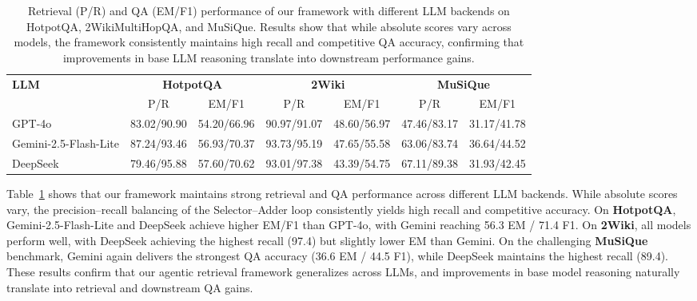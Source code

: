 \documentclass{article} %
\begin{document}
\begin{table}[ht]
\centering
\small
\setlength{\tabcolsep}{4pt} %
\caption{Retrieval (P/R) and QA (EM/F1) performance of our framework with different LLM backends on HotpotQA, 2WikiMultiHopQA, and MuSiQue. Results show that while absolute scores vary across models, the framework consistently maintains high recall and competitive QA accuracy, confirming that improvements in base LLM reasoning translate into downstream performance gains.}

\begin{tabular}{l|c|c|c|c|c|c}
\toprule
\multirow{2}{*}{\textbf{LLM}}
& \multicolumn{2}{c|}{\textbf{HotpotQA}} 
& \multicolumn{2}{c|}{\textbf{2Wiki}} 
& \multicolumn{2}{c}{\textbf{MuSiQue}} \\
\cmidrule(lr){2-3} \cmidrule(lr){4-5} \cmidrule(lr){6-7}
 & P/R & EM/F1 & P/R & EM/F1 & P/R & EM/F1 \\
\midrule
GPT-4o & 83.02/90.90 & 54.20/66.96 & 90.97/91.07  & 48.60/56.97 & 47.46/83.17 & 31.17/41.78 \\
\midrule
Gemini-2.5-Flash-Lite & 87.24/93.46 & 56.93/70.37 & 93.73/95.19  & 47.65/55.58  & 63.06/83.74  & 36.64/44.52 \\
\midrule
DeepSeek              & 79.46/95.88    & 57.60/70.62    & 93.01/97.38  & 43.39/54.75  & 67.11/89.38  & 31.93/42.45  \\
\bottomrule
\end{tabular}
\label{tab:llm_results}
\end{table}
Table~\ref{tab:llm_results} shows that our framework maintains strong retrieval and QA performance across different LLM backends. 
While absolute scores vary, the precision--recall balancing of the Selector--Adder loop consistently yields high recall and competitive accuracy. 
On \textbf{HotpotQA}, Gemini-2.5-Flash-Lite and DeepSeek achieve higher EM/F1 than GPT-4o, with Gemini reaching 56.3 EM / 71.4 F1. 
On \textbf{2Wiki}, all models perform well, with DeepSeek achieving the highest recall (97.4) but slightly lower EM than Gemini. 
On the challenging \textbf{MuSiQue} benchmark, Gemini again delivers the strongest QA accuracy (36.6 EM / 44.5 F1), while DeepSeek maintains the highest recall (89.4). 
These results confirm that our agentic retrieval framework generalizes across LLMs, and improvements in base model reasoning naturally translate into retrieval and downstream QA gains.

\end{document}
